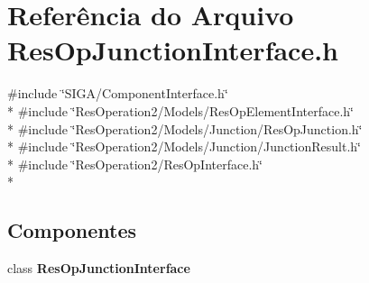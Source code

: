 \section{Referência do Arquivo Res\+Op\+Junction\+Interface.\+h}
\label{_res_op_junction_interface_8h}
{\ttfamily \#include \char`\"{}S\+I\+G\+A/\+Component\+Interface.\+h\char`\"{}}\\*
{\ttfamily \#include \char`\"{}Res\+Operation2/\+Models/\+Res\+Op\+Element\+Interface.\+h\char`\"{}}\\*
{\ttfamily \#include \char`\"{}Res\+Operation2/\+Models/\+Junction/\+Res\+Op\+Junction.\+h\char`\"{}}\\*
{\ttfamily \#include \char`\"{}Res\+Operation2/\+Models/\+Junction/\+Junction\+Result.\+h\char`\"{}}\\*
{\ttfamily \#include \char`\"{}Res\+Operation2/\+Res\+Op\+Interface.\+h\char`\"{}}\\*
\subsection*{Componentes}
\begin{DoxyCompactItemize}
\item 
class {\bf Res\+Op\+Junction\+Interface}
\end{DoxyCompactItemize}
